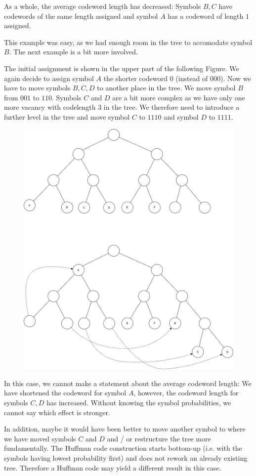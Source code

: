 As a whole, the average codeword length has decreased: Symbols $B, C$ have codewords of the same length assigned and symbol $A$ has a codeword of length $1$ assigned.

This example was easy, as we had enough room in the tree to accomodate symbol $B$. The next example is a bit more involved.

The initial assignment is shown in the upper part of the following Figure. We again decide to assign symbol $A$ the shorter codeword $0$ (instead of $000$). Now we have to move symbols $B, C, D$ to another place in the tree. We move symbol $B$ from $001$ to $110$. Symbols $C$ and $D$ are a bit more complex as we have only one more vacancy with codelength $3$ in the tree. We therefore need to introduce a further level in the tree and move symbol $C$ to $1110$ and symbol $D$ to $1111$.

\begin{figure}[H]
    \centering
    \includegraphics[scale=0.4]{images/2021-04-26-scenario_2.png}
\end{figure}

In this case, we cannot make a statement about the average codeword length: We have shortened the codeword for symbol $A$, however, the codeword length for symbols $C, D$ has increased. Without knowing the symbol probabilities, we cannot say which effect is stronger.

In addition, maybe it would have been better to move another symbol to where we have moved symbols $C$ and $D$ and / or restructure the tree more fundamentally. The Huffman code construction starts bottom-up (i.e. with the symbols having lowest probability first) and does not rework an already existing tree. Therefore a Huffman code may yield a different result in this case.



